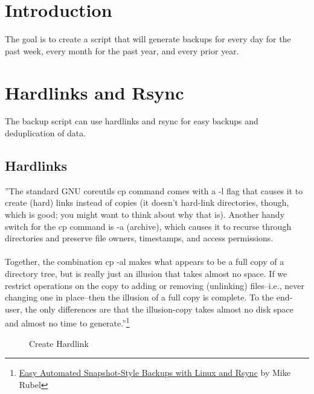 \documentclass[12pt,letterpaper,dvips]{article}
\newcommand{\cmd}[1]{\texttt{#1}}
\begin{document}
\newpage
\section{Introduction}
The goal is to create a script that will generate backups for every day for the past
week, every month for the past year, and every prior year.


\newpage
\section{Hardlinks and Rsync}
The backup script can use hardlinks and rsync for easy backups and deduplication of data.

\subsection{Hardlinks}
''The standard GNU coreutils cp command comes with a -l flag that causes it to create (hard) links
instead of copies (it doesn't hard-link directories, though, which is good; you might want to
think about why that is).  Another handy switch for the cp command is -a (archive), which causes
it to recurse through directories and preserve file owners, timestamps, and access permissions.\\
\\
\noindent Together, the combination cp -al makes what appears to be a full copy of a directory tree, but is
really just an illusion that takes almost no space.  If we restrict operations on the copy to
adding or removing (unlinking) files--i.e., never changing one in place--then the illusion of a
full copy is complete.  To the end-user, the only differences are that the illusion-copy takes
almost no disk space and almost no time to generate.''\footnote{\href{http://www.mikerubel.org/computers/rsync_snapshots/}{Easy Automated Snapshot-Style Backups with Linux and Rsync} by Mike Rubel}


\begin{figure}
\begin{center}
\framebox{
\begin{minipage}[t]{0.10\textwidth}
\begin{center}
\cmd{cp -al}
\end{center}
\end{minipage}
}
\caption{Create Hardlink}
\label{fig:create_hardlink}
\end{center}
\end{figure}
\end{document}
